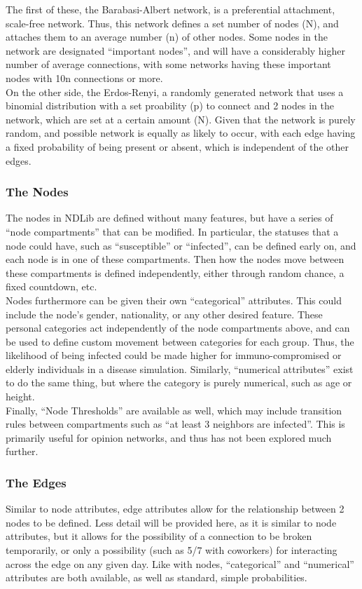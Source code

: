 \documentclass{article}
\numberwithin{equation}{section} %
\begin{document}
\begin{multicols}{2}
  The first of these, the Barabasi-Albert network, is a preferential attachment, scale-free network. Thus, this network defines a set number of nodes (N), and attaches them to an average number (n) of other nodes. Some nodes in the network are designated ``important nodes'', and will have a considerably higher number of average connections, with some networks having these important nodes with 10n connections or more. \\

  On the other side, the Erdos-Renyi, a randomly generated network that uses a binomial distribution with a set proability (p) to connect and 2 nodes in the network, which are set at a certain amount (N). Given that the network is purely random, and possible network is equally as likely to occur, with each edge having a fixed probability of being present or absent, which is independent of the other edges. 

  \subsubsection{The Nodes}
  The nodes in NDLib are defined without many features, but have a series of ``node compartments'' that can be modified. In particular, the statuses that a node could have, such as ``susceptible'' or ``infected'', can be defined early on, and each node is in one of these compartments. Then how the nodes move between these compartments is defined independently, either through random chance, a fixed countdown, etc. \\

  Nodes furthermore can be given their own ``categorical'' attributes. This could include the node's gender, nationality, or any other desired feature. These personal categories act independently of the node compartments above, and can be used to define custom movement between categories for each group. Thus, the likelihood of being infected could be made higher for immuno-compromised or elderly individuals in a disease simulation. Similarly, ``numerical attributes'' exist to do the same thing, but where the category is purely numerical, such as age or height. \\

  Finally, ``Node Thresholds'' are available as well, which may include transition rules between compartments such as ``at least 3 neighbors are infected''. This is primarily useful for opinion networks, and thus has not been explored much further.

  \subsubsection{The Edges}
  Similar to node attributes, edge attributes allow for the relationship between 2 nodes to be defined. Less detail will be provided here, as it is similar to node attributes, but it allows for the possibility of a connection to be broken temporarily, or only a possibility (such as 5/7 with coworkers) for interacting across the edge on any given day. Like with nodes, ``categorical'' and ``numerical'' attributes are both available, as well as standard, simple probabilities.


\end{multicols}
\end{document}
